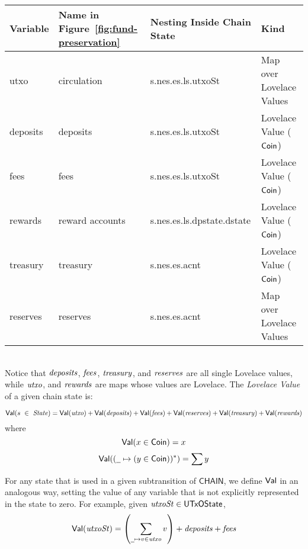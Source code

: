 \begin{tabular}{||l|l|l|l||}\hline\hline

  \textbf{Variable} & \textbf{Name in Figure~\ref{fig:fund-preservation}}
                    & \textbf{Nesting Inside Chain State} & \textbf{Kind} \\ \hline
  utxo & circulation & s.nes.es.ls.utxoSt & Map over Lovelace Values  \\ \hline
  deposits & deposits &  s.nes.es.ls.utxoSt & Lovelace Value ($\mathsf{Coin}$) \\ \hline
  fees & fees &  s.nes.es.ls.utxoSt & Lovelace Value ($\mathsf{Coin}$) \\ \hline
  rewards & reward accounts & s.nes.es.ls.dpstate.dstate  & Lovelace Value ($\mathsf{Coin}$)  \\ \hline
  treasury & treasury &  s.nes.es.acnt  & Lovelace Value ($\mathsf{Coin}$) \\ \hline
  reserves & reserves & s.nes.es.acnt & Map over Lovelace Values \\ \hline
  \hline
\end{tabular}
\\[1em]

\noindent
Notice that $\mathit{deposits}$, $\mathit{fees}$, $\mathit{treasury}$, and $\mathit{reserves}$
are all single Lovelace values, while $\mathit{utxo}$, and $\mathit{rewards}$ are
maps whose values are Lovelace.
%
The \emph{Lovelace Value} of a given chain state is:
\begin{definition}
  \label{def:val}
  \begin{equation*}
    \mathsf{Val}(s~\in~\mathit{State}) =
        \mathsf{Val}(\mathit{utxo}) +
            \mathsf{Val}(\mathit{deposits}) +
            \mathsf{Val}(\mathit{fees}) +
            \mathsf{Val}(\mathit{reserves}) +
            \mathsf{Val}(\mathit{treasury}) +
            \mathsf{Val}(\mathit{rewards})
  \end{equation*}
  where
  \begin{equation*}
      \mathsf{Val}(x \in \mathsf{Coin}) = x
  \end{equation*}
  \begin{equation*}
      \Val((\wcard\mapsto (y \in \Coin))^{*}) = \sum y
  \end{equation*}
\end{definition}

\noindent
For any state that is used in a given subtransition of $\mathsf{CHAIN}$,
we define $\mathsf{Val}{}$ in an analogous way, setting the value of any variable that is not explicitly
represented in the state to zero.
For example, given $\mathit{utxoSt}\in\mathsf{UTxOState}$,
\begin{equation*}
  \Val(\var{utxoSt}) =
  \left(\sum_{\wcard\mapsto v\in\var{utxo}}v\right) + \var{deposits} + \var{fees}
\end{equation*}


